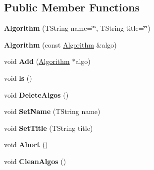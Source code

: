 \subsection*{Public Member Functions}
\begin{DoxyCompactItemize}
\item 
\hypertarget{class_h_a_l_1_1_algorithm_a50506c07b5959ecd740f5683bf50ea93}{{\bfseries Algorithm} (T\-String name=\char`\"{}\char`\"{}, T\-String title=\char`\"{}\char`\"{})}\label{class_h_a_l_1_1_algorithm_a50506c07b5959ecd740f5683bf50ea93}

\item 
\hypertarget{class_h_a_l_1_1_algorithm_a77b66292cc2f8e021ed819daebbd7c51}{{\bfseries Algorithm} (const \hyperlink{class_h_a_l_1_1_algorithm}{Algorithm} \&algo)}\label{class_h_a_l_1_1_algorithm_a77b66292cc2f8e021ed819daebbd7c51}

\item 
\hypertarget{class_h_a_l_1_1_algorithm_a6e6834d936897cd573ce858d9b26150e}{void {\bfseries Add} (\hyperlink{class_h_a_l_1_1_algorithm}{Algorithm} $\ast$algo)}\label{class_h_a_l_1_1_algorithm_a6e6834d936897cd573ce858d9b26150e}

\item 
\hypertarget{class_h_a_l_1_1_algorithm_aaadc2f897f854c3808753fe8bdc88507}{void {\bfseries ls} ()}\label{class_h_a_l_1_1_algorithm_aaadc2f897f854c3808753fe8bdc88507}

\item 
\hypertarget{class_h_a_l_1_1_algorithm_a5a25656c41939992b7a701f9f6c22476}{void {\bfseries Delete\-Algos} ()}\label{class_h_a_l_1_1_algorithm_a5a25656c41939992b7a701f9f6c22476}

\item 
\hypertarget{class_h_a_l_1_1_algorithm_a7815cd340c0800cd2b5567814bbcc40a}{void {\bfseries Set\-Name} (T\-String name)}\label{class_h_a_l_1_1_algorithm_a7815cd340c0800cd2b5567814bbcc40a}

\item 
\hypertarget{class_h_a_l_1_1_algorithm_aa225c7fa0c6fdef7a2807c3eaa225d83}{void {\bfseries Set\-Title} (T\-String title)}\label{class_h_a_l_1_1_algorithm_aa225c7fa0c6fdef7a2807c3eaa225d83}

\item 
\hypertarget{class_h_a_l_1_1_algorithm_a0b2b7e0a90824e7c2ed31fd8fc299d61}{void {\bfseries Abort} ()}\label{class_h_a_l_1_1_algorithm_a0b2b7e0a90824e7c2ed31fd8fc299d61}

\item 
\hypertarget{class_h_a_l_1_1_algorithm_a77516eeeffb62ed507616ddd006e023c}{void {\bfseries Clean\-Algos} ()}\label{class_h_a_l_1_1_algorithm_a77516eeeffb62ed507616ddd006e023c}


\end{DoxyCompactItemize}
